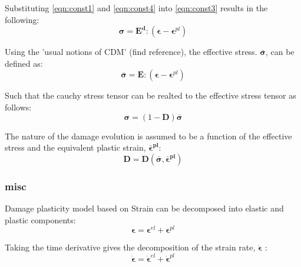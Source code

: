 Substituting \ref{eqn:const1} and \ref{eqn:const4} into \ref{eqn:const3}
results in the following: 
\begin{equation}
\boldsymbol{\sigma}=\mathbf{E^{d}}:(\boldsymbol{\epsilon}-\boldsymbol{\epsilon}^{pl})\label{eqn:const5}
\end{equation}


Using the 'usual notions of CDM' (find
reference), the effective stress. $\boldsymbol{\bar{\sigma}}$, can
be defined as: 
\begin{equation}
\boldsymbol{\bar{\sigma}}=\mathbf{E}:(\boldsymbol{\epsilon}-\boldsymbol{\epsilon}^{pl})\label{eqn:const6}
\end{equation}


Such that the cauchy stress tensor can be realted to the effective
stress tensor as follows: 
\begin{equation}
\boldsymbol{\sigma}=(1-\mathbf{D})\boldsymbol{\bar{\sigma}}\label{eqn:const7}
\end{equation}


The nature of the damage evolution is assumed to be a function of
the effective stress and the equivalent plastic strain, $\boldsymbol{\bar{\epsilon}^{pl}}$:
\begin{equation}
\mathbf{D}=\mathbf{D}(\boldsymbol{\bar{\sigma}},\boldsymbol{\bar{\epsilon}^{pl}})\label{eqn:const8}
\end{equation}

\subsubsection{misc}
Damage plasticity model based on Strain can be decomposed into elastic
and plastic components: 
\begin{equation}
\boldsymbol{\epsilon}=\boldsymbol{\epsilon}^{el}+\boldsymbol{\epsilon}^{pl}\label{eqn:const1}
\end{equation}


Taking the time derivative gives the decomposition of the strain rate,
$\boldsymbol{\dot{\epsilon}}$ : 
\begin{equation}
\boldsymbol{\dot{\epsilon}}=\boldsymbol{\dot{\epsilon}}^{el}+\boldsymbol{\dot{\epsilon}}^{pl}\label{eqn:const2}
\end{equation}
